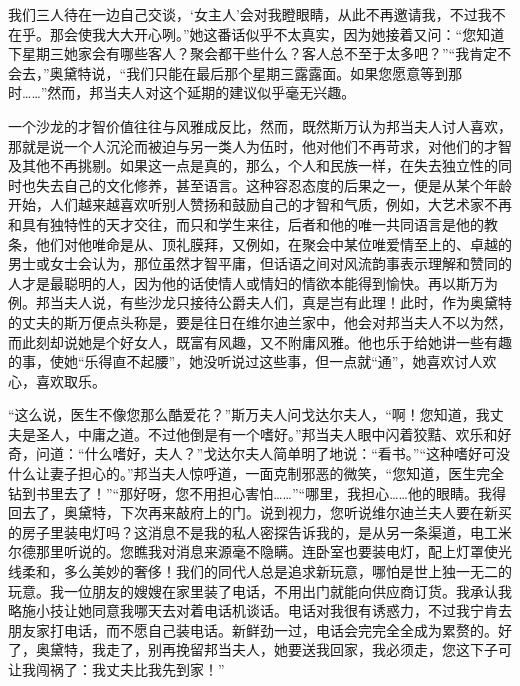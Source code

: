 我们三人待在一边自己交谈，‘女主人’会对我瞪眼睛，从此不再邀请我，不过我不在乎。那会使我大大开心咧。”她这番话似乎不太真实，因为她接着又问：“您知道下星期三她家会有哪些客人？聚会都干些什么？客人总不至于太多吧？”“我肯定不会去，”奥黛特说，“我们只能在最后那个星期三露露面。如果您愿意等到那时……”然而，邦当夫人对这个延期的建议似乎毫无兴趣。
\par 一个沙龙的才智价值往往与风雅成反比，然而，既然斯万认为邦当夫人讨人喜欢，那就是说一个人沉沦而被迫与另一类人为伍时，他对他们不再苛求，对他们的才智及其他不再挑剔。如果这一点是真的，那么，个人和民族一样，在失去独立性的同时也失去自己的文化修养，甚至语言。这种容忍态度的后果之一，便是从某个年龄开始，人们越来越喜欢听别人赞扬和鼓励自己的才智和气质，例如，大艺术家不再和具有独特性的天才交往，而只和学生来往，后者和他的唯一共同语言是他的教条，他们对他唯命是从、顶礼膜拜，又例如，在聚会中某位唯爱情至上的、卓越的男士或女士会认为，那位虽然才智平庸，但话语之间对风流韵事表示理解和赞同的人才是最聪明的人，因为他的话使情人或情妇的情欲本能得到愉快。再以斯万为例。邦当夫人说，有些沙龙只接待公爵夫人们，真是岂有此理！此时，作为奥黛特的丈夫的斯万便点头称是，要是往日在维尔迪兰家中，他会对邦当夫人不以为然，而此刻却说她是个好女人，既富有风趣，又不附庸风雅。他也乐于给她讲一些有趣的事，使她“乐得直不起腰”，她没听说过这些事，但一点就“通”，她喜欢讨人欢心，喜欢取乐。
\par “这么说，医生不像您那么酷爱花？”斯万夫人问戈达尔夫人，“啊！您知道，我丈夫是圣人，中庸之道。不过他倒是有一个嗜好。”邦当夫人眼中闪着狡黠、欢乐和好奇，问道：“什么嗜好，夫人？”戈达尔夫人简单明了地说：“看书。”“这种嗜好可没什么让妻子担心的。”邦当夫人惊呼道，一面克制邪恶的微笑，“您知道，医生完全钻到书里去了！”“那好呀，您不用担心害怕……”“哪里，我担心……他的眼睛。我得回去了，奥黛特，下次再来敲府上的门。说到视力，您听说维尔迪兰夫人要在新买的房子里装电灯吗？这消息不是我的私人密探告诉我的，是从另一条渠道，电工米尔德那里听说的。您瞧我对消息来源毫不隐瞒。连卧室也要装电灯，配上灯罩使光线柔和，多么美妙的奢侈！我们的同代人总是追求新玩意，哪怕是世上独一无二的玩意。我一位朋友的嫂嫂在家里装了电话，不用出门就能向供应商订货。我承认我略施小技让她同意我哪天去对着电话机谈话。电话对我很有诱惑力，不过我宁肯去朋友家打电话，而不愿自己装电话。新鲜劲一过，电话会完完全全成为累赘的。好了，奥黛特，我走了，别再挽留邦当夫人，她要送我回家，我必须走，您这下子可让我闯祸了：我丈夫比我先到家！”
